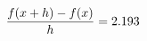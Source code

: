 \documentclass[preview]{standalone}
\begin{document}
\begin{align*}
\special{dvisvgm:raw <g id='unique000'>}\frac{f(x+h)-f(x)}{h} = 2.193\special{dvisvgm:raw </g>}
\end{align*}
\end{document}
